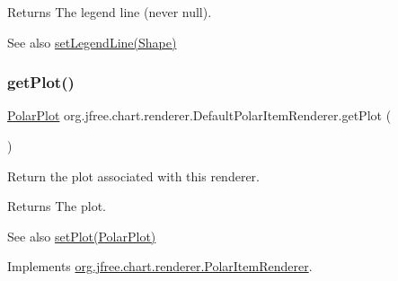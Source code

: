\begin{DoxyReturn}{Returns}
The legend line (never {\ttfamily null}).
\end{DoxyReturn}
\begin{DoxySeeAlso}{See also}
\mbox{\hyperlink{classorg_1_1jfree_1_1chart_1_1renderer_1_1_default_polar_item_renderer_ac2ba04156bf456553d124b59febe8919}{set\+Legend\+Line(\+Shape)}} 
\end{DoxySeeAlso}
\mbox{\label{classorg_1_1jfree_1_1chart_1_1renderer_1_1_default_polar_item_renderer_a9cd32aebbc67cd428f05aafd7cb2c3ff}} 
\subsubsection{\texorpdfstring{get\+Plot()}{getPlot()}}
{\footnotesize\ttfamily \mbox{\hyperlink{classorg_1_1jfree_1_1chart_1_1plot_1_1_polar_plot}{Polar\+Plot}} org.\+jfree.\+chart.\+renderer.\+Default\+Polar\+Item\+Renderer.\+get\+Plot (\begin{DoxyParamCaption}{ }\end{DoxyParamCaption})}

Return the plot associated with this renderer.

\begin{DoxyReturn}{Returns}
The plot.
\end{DoxyReturn}
\begin{DoxySeeAlso}{See also}
\mbox{\hyperlink{classorg_1_1jfree_1_1chart_1_1renderer_1_1_default_polar_item_renderer_ad296a32b8f8f8c0bd6d460204781eaea}{set\+Plot(\+Polar\+Plot)}} 
\end{DoxySeeAlso}


Implements \mbox{\hyperlink{interfaceorg_1_1jfree_1_1chart_1_1renderer_1_1_polar_item_renderer_a3a7f957c63544df781986d288727a5cf}{org.\+jfree.\+chart.\+renderer.\+Polar\+Item\+Renderer}}.

\mbox{\label{classorg_1_1jfree_1_1chart_1_1renderer_1_1_default_polar_item_renderer_a359b2063f711745b5728ee139243b678}} 
